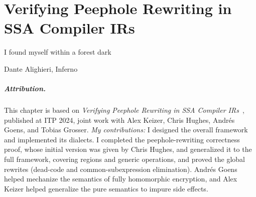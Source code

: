 \newcommand{\messa}[1]{\ensuremath{\texttt{LeanMLIR}(#1)}}


\providecommand{\GreenBox}[1]{\smash{\colorbox{materialLightGreen}{\texttt{#1}}}}
\providecommand{\LightGrayBlueBox}[1]{\smash{\colorbox{materialLightGrayBlueColor}{\texttt{#1}}}}

\chapter{Verifying Peephole Rewriting in SSA Compiler IRs}
\label{ch:lean-mlir}
\epigraph{I found myself within a forest dark} {Dante Alighieri, Inferno}

\paragraph*{Attribution.} This chapter is based on \emph{Verifying Peephole
Rewriting in SSA Compiler IRs}~\citep{leanmlir}, published at ITP 2024, joint
work with Alex Keizer, Chris Hughes, Andrés Goens, and Tobias Grosser.
\emph{My contributions:} I designed the overall framework and implemented its
dialects. I completed the peephole-rewriting correctness proof, whose initial
version was given by Chris Hughes, and generalized it to the full framework,
covering regions and generic operations, and proved the global rewrites (dead-code
and common-subexpression elimination). Andrés Goens helped mechanize the semantics
of fully homomorphic encryption, and Alex Keizer helped generalize the pure
semantics to impure side effects.


